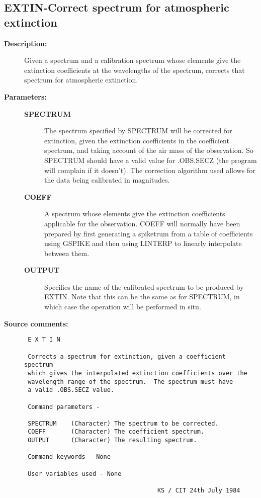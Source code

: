 \subsection{EXTIN-\label{EXTIN}Correct spectrum for atmospheric extinction}
\begin{description}

\item [{\bf Description:}]
 Given a spectrum and a calibration spectrum whose elements give
 the extinction coefficients at the wavelengths of the spectrum,
 corrects that spectrum for atmospheric extinction.

\item [{\bf Parameters:}]
\begin{description}
\item [{\bf SPECTRUM}]
 The spectrum specified by SPECTRUM will be corrected
 for extinction, given the extinction coefficients in
 the coefficient spectrum, and taking account of the air
 mass of the observation.  So SPECTRUM should have a
 valid value for .OBS.SECZ (the program will complain
 if it doesn't).  The correction algorithm used allows
 for the data being calibrated in magnitudes.
\item [{\bf COEFF}]
 A spectrum whose elements give the extinction
 coefficients applicable for the observation.  COEFF will
 normally have been prepared by first generating a spiketrum
 from a table of coefficients using GSPIKE and then using
 LINTERP to linearly interpolate between them.
\item [{\bf OUTPUT}]
 Specifies the name of the calibrated spectrum to be produced
 by EXTIN.  Note that this can be the same as for SPECTRUM,
 in which case the operation will be performed in situ.
\end{description}

\item [{\bf Source comments:}]
\begin{verbatim}
 E X T I N

 Corrects a spectrum for extinction, given a coefficient spectrum
 which gives the interpolated extinction coefficients over the
 wavelength range of the spectrum.  The spectrum must have
 a valid .OBS.SECZ value.

 Command parameters -

 SPECTRUM    (Character) The spectrum to be corrected.
 COEFF       (Character) The coefficient spectrum.
 OUTPUT      (Character) The resulting spectrum.

 Command keywords - None

 User variables used - None

                                     KS / CIT 24th July 1984
\end{verbatim}
\end{description}
